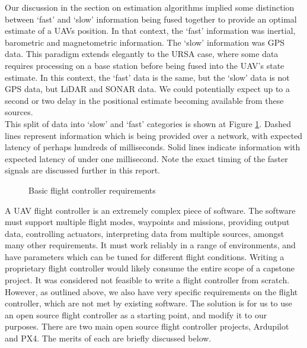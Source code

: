 \documentclass[capstone_report.tex]{subfiles}
\begin{document}
    Our discussion in the section on estimation algorithms implied some distinction between `fast' and `slow' information being fused together to provide an optimal estimate of a UAVs position. In that context, the `fast' information was inertial, barometric and magnetometric information. The `slow' information was GPS data. This paradigm extends elegantly to the URSA case, where some data requires processing on a base station before being fused into the UAV's state estimate. In this context, the `fast' data is the same, but the `slow' data is not GPS data, but LiDAR and SONAR data. We could potentially expect up to a second or two delay in the positional estimate becoming available from these sources. \\

    This split of data into `slow' and `fast' categories is shown at Figure \ref{fig:FCU}. Dashed lines represent information which is being provided over a network, with expected latency of perhaps hundreds of milliseconds. Solid lines indicate information with expected latency of under one millisecond. Note the exact timing of the faster signals are discussed further in this report.

    \begin{figure}[H]
    	\centering
 	   	
 	   	\caption{Basic flight controller requirements\label{fig:FCU}}
    \end{figure}

    A UAV flight controller is an extremely complex piece of software. The software must support multiple flight modes, waypoints and missions, providing output data, controlling actuators, interpreting data from multiple sources, amongst many other requirements. It must work reliably in a range of environments, and have parameters which can be tuned for different flight conditions. Writing a proprietary flight controller would likely consume the entire scope of a capstone project. It was considered not feasible to write a flight controller from scratch. \\

    However, as outlined above, we also have very specific requirements on the flight controller, which are not met by existing software. The solution is for us to use an open source flight controller as a starting point, and modify it to our purposes. There are two main open source flight controller projects, Ardupilot and PX4. The merits of each are briefly discussed below.
\end{document}
